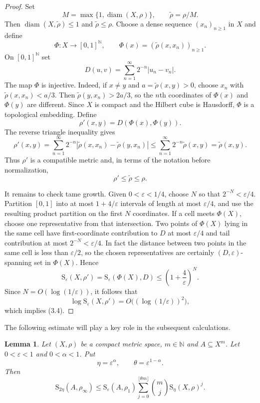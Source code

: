 \documentclass[12pt]{amsart}
\newtheorem{lemma}[theorem]{Lemma}
\theoremstyle{definition}
\theoremstyle{remark}
\newcommand{\diam}{\operatorname{diam}}
\newcommand{\N}{\mathbb N}
\begin{document}
\begin{proof}
Set
\[
 M=\max\{1,\diam(X,\rho)\},
 \qquad \widetilde\rho=\rho/M.
\]
Then $\diam(X,\widetilde\rho)\leq1$ and
$\widetilde\rho\leq\rho$. Choose a dense sequence $(x_n)_{n\geq1}$ in $X$ and define
\[
 \Phi:X\longrightarrow [0,1]^{\N},
 \qquad
 \Phi(x)=(\widetilde\rho(x,x_n))_{n\geq1}.
\]
On $[0,1]^{\N}$ set
\[
 D(u,v)=\sum_{n=1}^\infty 2^{-n}|u_n-v_n|.
\]
The map $\Phi$ is injective. Indeed, if $x\neq y$ and $a=\widetilde\rho(x,y)>0$, choose $x_n$ with $\widetilde\rho(x,x_n)<a/3$. Then
$\widetilde\rho(y,x_n)>2a/3$, so the $n$th coordinates of $\Phi(x)$ and $\Phi(y)$ are different. Since $X$ is compact and the Hilbert cube is Hausdorff, $\Phi$ is a topological embedding. Define
\[
 \rho'(x,y)=D(\Phi(x),\Phi(y)).
\]
The reverse triangle inequality gives
\[
 \rho'(x,y)=\sum_{n=1}^\infty 2^{-n}|\widetilde\rho(x,x_n)-\widetilde\rho(y,x_n)|
 \leq \sum_{n=1}^\infty 2^{-n}\widetilde\rho(x,y)
 =\widetilde\rho(x,y).
\]
Thus $\rho'$ is a compatible metric and, in terms of the notation before normalization,
\[
 \rho'\leq\widetilde\rho\leq\rho.
\]

It remains to check tame growth. Given $0<\varepsilon<1/4$, choose $N$ so that $2^{-N}<\varepsilon/4$. Partition $[0,1]$ into at most $1+4/\varepsilon$ intervals of length at most $\varepsilon/4$, and use the resulting product partition on the first $N$ coordinates. If a cell meets $\Phi(X)$, choose one representative from that intersection. Two points of $\Phi(X)$ lying in the same cell have first-coordinate contribution to $D$ at most $\varepsilon/4$ and tail contribution at most $2^{-N}<\varepsilon/4$. In fact the distance between two points in the same cell is less than $\varepsilon/2$, so the chosen representatives are certainly $(D,\varepsilon)$-spanning set in $\Phi(X)$. Hence
\[
 \mathrm{S}_\varepsilon(X,\rho')=\mathrm{S}_\varepsilon(\Phi(X),D)
 \leq \left(1+\frac4\varepsilon\right)^N.
\]
Since $N=O(\log(1/\varepsilon))$, it follows that
\[
 \log \mathrm{S}_\varepsilon(X,\rho')
 =O\bigl((\log(1/\varepsilon))^2\bigr),
\]
which implies (3.4).
\end{proof}



The following estimate will play a key role in the subsequent calculations.

\begin{lemma}\label{lem:sparse}
Let $(X,\rho)$ be a compact metric space, $m \in \mathbb{N}$ and $A\subseteq X^m$. Let  $0<\varepsilon<1$ and $0<\alpha<1$. Put
\[
 \eta=\varepsilon^\alpha,
 \qquad
 \theta=\varepsilon^{1-\alpha}.
\]
Then
\[
 \mathrm{S}_{2\eta}(A,\rho_\infty)
 \leq
 \mathrm{S}_\varepsilon(A,\rho_1)
 \sum_{j=0}^{\lfloor\theta m\rfloor}
 \binom mj \mathrm{S}_\eta(X,\rho)^j.
 \tag{3.5}
\]
\end{lemma}
\end{document}
